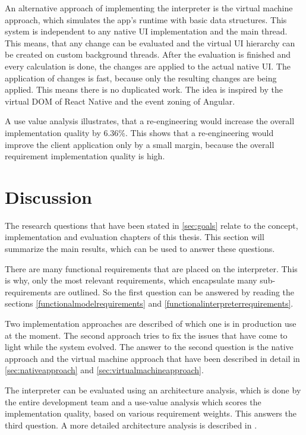 An alternative approach of implementing the interpreter is the virtual machine approach, which simulates the app's runtime with basic data structures.
This system is independent to any native \ac{UI} implementation and the main thread.
This means, that any change can be evaluated and the virtual \ac{UI} hierarchy can be created on custom background threads.
After the evaluation is finished and every calculation is done, the changes are applied to the actual native \ac{UI}.
The application of changes is fast, because only the resulting changes are being applied.
This means there is no duplicated work.
The idea is inspired by the virtual DOM of React Native and the event zoning of Angular.

A use value analysis illustrates, that a re-engineering would increase the overall implementation quality by 6.36\%.
This shows that a re-engineering would improve the client application only by a small margin, because the overall requirement implementation quality is high.

\section{Discussion}

The research questions that have been stated in \ref{sec:goals} relate to the concept, implementation and evaluation chapters of this thesis.
This section will summarize the main results, which can be used to answer these questions.

There are many functional requirements that are placed on the interpreter.
This is why, only the most relevant requirements, which encapsulate many sub-requirements are outlined.
So the first question can be answered by reading the sections \ref{functionalmodelrequirements} and \ref{functionalinterpreterrequirements}.

Two implementation approaches are described of which one is in production use at the moment.
The second approach tries to fix the issues that have come to light while the system evolved.
The answer to the second question is the native approach and the virtual machine approach that have been described in detail in \ref{sec:nativeapproach} and \ref{sec:virtualmachineapproach}.

The interpreter can be evaluated using an architecture analysis, which is done by the entire development team and a use-value analysis which scores the implementation quality, based on various requirement weights.
This answers the third question.
A more detailed architecture analysis is described in \cite{klein_evaluating_2001}.

